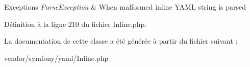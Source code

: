\begin{DoxyExceptions}{Exceptions}
{\em Parse\+Exception} & When malformed inline Y\+A\+ML string is parsed \\
\hline
\end{DoxyExceptions}


Définition à la ligne 210 du fichier Inline.\+php.



La documentation de cette classe a été générée à partir du fichier suivant \+:\begin{DoxyCompactItemize}
\item 
vendor/symfony/yaml/Inline.\+php\end{DoxyCompactItemize}
